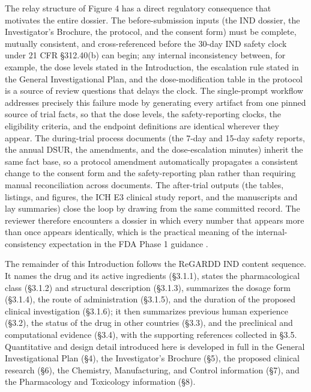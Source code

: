 The relay structure of Figure 4 has a direct regulatory consequence that motivates
the entire dossier. The before-submission inputs (the IND dossier, the
Investigator's Brochure, the protocol, and the consent form) must be complete,
mutually consistent, and cross-referenced before the 30-day IND safety clock under
21 CFR \S 312.40(b) can begin; any internal inconsistency between, for example, the
dose levels stated in the Introduction, the escalation rule stated in the General
Investigational Plan, and the dose-modification table in the protocol is a source
of review questions that delays the clock. The single-prompt workflow addresses
precisely this failure mode by generating every artifact from one pinned source of
trial facts, so that the dose levels, the safety-reporting clocks, the eligibility
criteria, and the endpoint definitions are identical wherever they appear. The
during-trial process documents (the 7-day and 15-day safety reports, the annual
DSUR, the amendments, and the dose-escalation minutes) inherit the same fact base,
so a protocol amendment automatically propagates a consistent change to the consent
form and the safety-reporting plan rather than requiring manual reconciliation
across documents. The after-trial outputs (the tables, listings, and figures, the
ICH E3 clinical study report, and the manuscripts and lay summaries) close the loop
by drawing from the same committed record. The reviewer therefore encounters a
dossier in which every number that appears more than once appears identically,
which is the practical meaning of the internal-consistency expectation in the FDA
Phase 1 guidance \cite{phase1guidance, oncotrialllm}.

The remainder of this Introduction follows the ReGARDD IND content sequence. It
names the drug and its active ingredients (\S 3.1.1), states the pharmacological
class (\S 3.1.2) and structural description (\S 3.1.3), summarizes the dosage form
(\S 3.1.4), the route of administration (\S 3.1.5), and the duration of the
proposed clinical investigation (\S 3.1.6); it then summarizes previous human
experience (\S 3.2), the status of the drug in other countries (\S 3.3), and the
preclinical and computational evidence (\S 3.4), with the supporting references
collected in \S 3.5. Quantitative and design detail introduced here is developed
in full in the General Investigational Plan (\S 4), the Investigator's Brochure
(\S 5), the proposed clinical research (\S 6), the Chemistry, Manufacturing, and
Control information (\S 7), and the Pharmacology and Toxicology information (\S 8).

